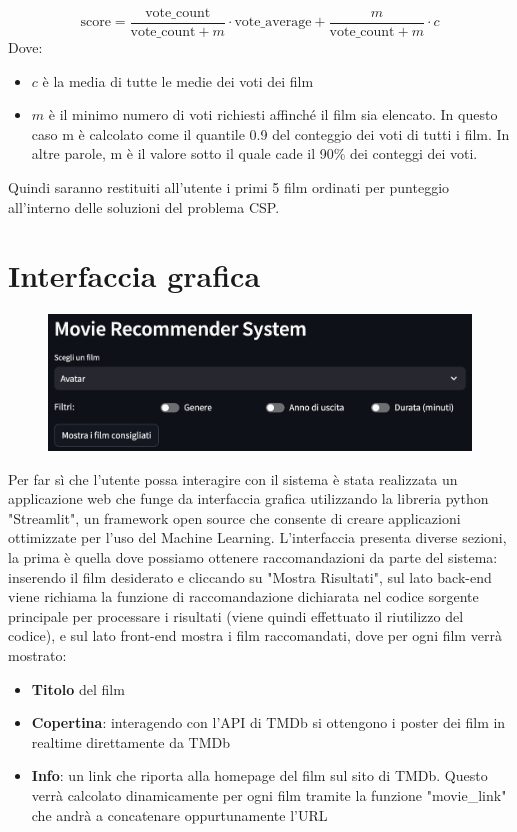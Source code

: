 \documentclass{report}
\begin{document}
        \[ \text{{score}} = \frac{{\text{{vote\_count}}}}{{\text{{vote\_count}} + m}} \cdot \text{{vote\_average}} + \frac{{m}}{{\text{{vote\_count}} + m}} \cdot c \]
        Dove:
        \begin{itemize}
            \item $c$ è la media di tutte le medie dei voti dei film
            \item $m$ è il minimo numero di voti richiesti affinché il film sia elencato. In questo caso m è calcolato come il quantile 0.9 del conteggio dei voti di tutti i film. In altre parole, m è il valore sotto il quale cade il 90\% dei conteggi dei voti.
        \end{itemize}
        Quindi saranno restituiti all'utente i primi 5 film ordinati per punteggio all'interno delle soluzioni del problema CSP. 
        
    \section{Interfaccia grafica}
        \begin{figure}[h]
            \centering
            \includegraphics[width=1\linewidth]{screenshot/sezioni_1.png}
        \end{figure}
        Per far sì che l'utente possa interagire con il sistema è stata realizzata un applicazione web che funge da interfaccia grafica utilizzando la libreria python "Streamlit", un framework open source che consente di creare applicazioni ottimizzate per l'uso del Machine Learning.
        L'interfaccia presenta diverse sezioni, la prima è quella dove possiamo ottenere raccomandazioni da parte del sistema:
        inserendo il film desiderato e cliccando su "Mostra Risultati", sul lato back-end viene richiama la funzione di raccomandazione dichiarata nel codice sorgente principale per processare i risultati (viene quindi effettuato il riutilizzo del codice), e sul lato front-end mostra i film raccomandati, dove per ogni film verrà mostrato:
        \begin{itemize}
            \item \textbf{Titolo} del film
            \item \textbf{Copertina}: interagendo con l'API di TMDb si ottengono i poster dei film in realtime direttamente da TMDb
            \item \textbf{Info}: un link che riporta alla homepage del film sul sito di TMDb. Questo verrà calcolato dinamicamente per ogni film tramite la funzione "movie\_link" che andrà a concatenare oppurtunamente l'URL
        \end{itemize} 
        
\end{document}
